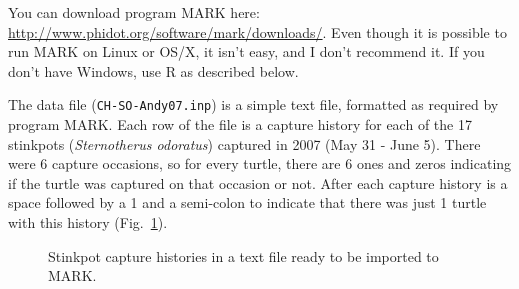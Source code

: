 \documentclass[12pt]{article}\usepackage[]{graphicx}\usepackage[]{color}
\begin{document}
You can download program MARK here:
\url{http://www.phidot.org/software/mark/downloads/}. Even though it
is possible to run MARK on Linux or OS/X, it isn't easy, and I don't
recommend it. If you don't have Windows, use R as described below.

The data file (\verb+CH-SO-Andy07.inp+) is a simple text file, formatted
as required by program MARK. Each row of the file is a capture history
for each of the 17 stinkpots ({\it Sternotherus odoratus}) captured in
2007 (May 31 - June 5). There were 6 capture occasions, so for every
turtle, there are 6 ones and zeros indicating if the turtle was
captured on that occasion or not. After each capture history is a
space followed by a 1 and a semi-colon to indicate that there was just
1 turtle with this history (Fig.~\ref{fig:stink07-data}).

\begin{figure}[h!]
  \centering
  \caption{\small Stinkpot capture histories in a text file ready to
    be imported to MARK.}
  \label{fig:stink07-data}
\end{figure}
\end{document}
